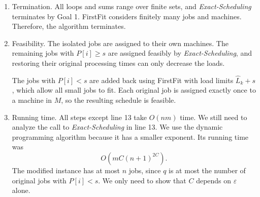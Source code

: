 \documentclass[12pt,a4paper]{article}
\theoremstyle{definition}
\theoremstyle{plain}
\begin{document}
\begin{enumerate}
\item Termination. All loops and sums range over finite sets, and
\textit{Exact-Scheduling} terminates by Goal 1. FirstFit considers finitely
many jobs and machines. Therefore, the algorithm terminates.

\item Feasibility. The isolated jobs are assigned to their own machines.
The remaining jobs with $P[i]\geq s$ are assigned feasibly by
\textit{Exact-Scheduling}, and restoring their original processing times
can only decrease the loads.

The jobs with $P[i]<s$ are added back using FirstFit with load limits
$\widehat{L}_k+s$, which allow all small jobs to fit. Each original job is assigned
exactly once to a machine in $M$, so the resulting schedule is feasible.
\item Running time. All steps except line 13 take $O(nm)$ time.
We still need to analyze the call to \textit{Exact-Scheduling} in line 13.
We use the dynamic programming algorithm because it has a smaller
exponent. Its running time was
\[
O\!\left(mC(n+1)^{2C}\right).
\]
The modified instance has at most $n$ jobs, since $q$ is at most the
number of original jobs with $P[i]<s$. We only need to show that $C$
depends on $\varepsilon$ alone.


\end{enumerate}
\end{document}
